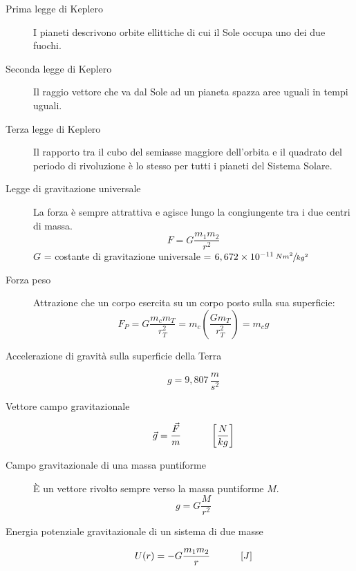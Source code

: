 \documentclass[a4paper,11pt,italian]{article}
\begin{document}
\begin{description}
  \item[Prima legge di Keplero]  
  I pianeti descrivono orbite ellittiche di cui il Sole occupa uno dei due fuochi.
  
  \item[Seconda legge di Keplero] 
  Il raggio vettore che va dal Sole ad un pianeta spazza aree uguali in tempi uguali.
  
  \item[Terza legge di Keplero] 
  Il rapporto tra il cubo del semiasse maggiore dell'orbita e il quadrato del periodo di rivoluzione è lo stesso per tutti i pianeti del Sistema Solare.
  
  \item[Legge di gravitazione universale] 
  La forza è sempre attrattiva e agisce lungo la congiungente tra i due centri di massa. 
  \[ F = G \frac{m_1 m_2}{r^2} \]
  $ G $ = costante di gravitazione universale = $ 6,672 \times 10^{-11} \, \sfrac{Nm^2}{kg^2} $
  
  \item[Forza peso] 
  Attrazione che un corpo esercita su un corpo posto sulla sua superficie: 
  \[ F_P = G \frac{m_{c} m_{T}}{r^2_{T}} =  m_{c} \left(\frac{G m_{T}}{r^2_{T}} \right) = m_{c} g \]
  
  \item[Accelerazione di gravità sulla superficie della Terra] 
  \[ g =  9, 807 \, \frac{m}{s^2} \]
  
  \item[Vettore campo gravitazionale] 
  \[ \vec{g} = \frac{\vec{F}}{m} \hspace*{3em} \left[ \frac{N}{kg} \right] \]
  
  \item[Campo gravitazionale di una massa puntiforme] 
  È un vettore rivolto sempre verso la massa puntiforme $ M $.
  \[ g = G \frac{M}{r^2} \]

%   
%   
  
  \item[Energia potenziale gravitazionale di un sistema di due masse] 
  \[ U(r) = - G \frac{m_1m_2}{r} \hspace*{3em} \left[ J \right] \]
\end{description}
\end{document}
